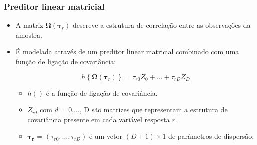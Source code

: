 \documentclass[10pt,
  aspectratio=169,
  serif,
  mathserif,
  professionalfont,
  compress,
  handout,
  ]{beamer}\usepackage[]{graphicx}\usepackage[]{color}
\begin{document}
\begin{frame}

\frametitle{Preditor linear matricial}

\begin{itemize}
  
  \itemsep 2ex
  
  \item A matriz $\boldsymbol{\Omega}(\boldsymbol{\tau}_r)$ descreve a estrutura de correlação entre as observações da amostra.
  
  \item É modelada através de um preditor linear matricial combinado com uma função de ligação de covariância:

$$
h\left \{ \boldsymbol{\Omega}(\boldsymbol{\tau}_r) \right \} = \tau_{r0}Z_0 + \ldots + \tau_{rD}Z_D
$$
  
  \begin{itemize}
  
  \itemsep 2ex
  
  \item $h()$ é a função de ligação de covariância.
  
  \item $Z_{rd}$ com $d$ = 0,$\ldots$, D são matrizes que representam a estrutura de covariância presente em cada variável resposta $r$.
  
  \item $\boldsymbol{\tau_r}$ = $(\tau_{r0}, \ldots, \tau_{rD})$ é um vetor $(D + 1) \times 1$ de parâmetros de dispersão. 
  
\end{itemize}

     
\end{itemize}

\end{frame}

\end{document}
